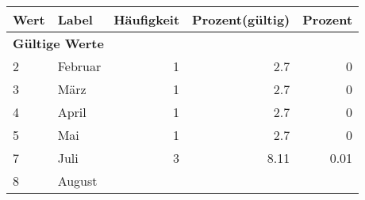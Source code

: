     \begin{longtable}{lXrrr}
     \toprule
     \textbf{Wert} & \textbf{Label} & \textbf{Häufigkeit} & \textbf{Prozent(gültig)} & \textbf{Prozent} \\
     \endhead
     \midrule
     \multicolumn{5}{l}{\textbf{Gültige Werte}}\\

     2 &
     \multicolumn{1}{X}{ Februar   } &


       \num{1} &
       \num[round-mode=places,round-precision=2]{2,7} &
         \num[round-mode=places,round-precision=2]{0} \\

     3 &
     \multicolumn{1}{X}{ März   } &


       \num{1} &
       \num[round-mode=places,round-precision=2]{2,7} &
         \num[round-mode=places,round-precision=2]{0} \\

     4 &
     \multicolumn{1}{X}{ April   } &


       \num{1} &
       \num[round-mode=places,round-precision=2]{2,7} &
         \num[round-mode=places,round-precision=2]{0} \\

     5 &
     \multicolumn{1}{X}{ Mai   } &


       \num{1} &
       \num[round-mode=places,round-precision=2]{2,7} &
         \num[round-mode=places,round-precision=2]{0} \\

     7 &
     \multicolumn{1}{X}{ Juli   } &


       \num{3} &
       \num[round-mode=places,round-precision=2]{8,11} &
         \num[round-mode=places,round-precision=2]{0,01} \\

     8 &
     \multicolumn{1}{X}{ August   } &



\end{longtable}
